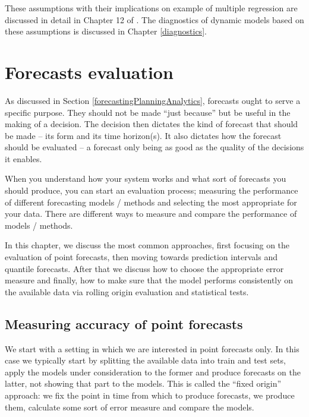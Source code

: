 \documentclass[
]{book}
\theoremstyle{definition}
\theoremstyle{definition}
\theoremstyle{definition}
\theoremstyle{definition}
\theoremstyle{remark}
\begin{document}
These assumptions with their implications on example of multiple regression are discussed in detail in Chapter 12 of \citet{SvetunkovSBA}. The diagnostics of dynamic models based on these assumptions is discussed in Chapter \ref{diagnostics}.

\hypertarget{forecastsEvaluation}{%
\chapter{Forecasts evaluation}\label{forecastsEvaluation}}

As discussed in Section \ref{forecastingPlanningAnalytics}, forecasts ought to serve a specific purpose. They should not be made ``just because'' but be useful in the making of a decision. The decision then dictates the kind of forecast that should be made -- its form and its time horizon(s). It also dictates how the forecast should be evaluated -- a forecast only being as good as the quality of the decisions it enables.

When you understand how your system works and what sort of forecasts you should produce, you can start an evaluation process; measuring the performance of different forecasting models / methods and selecting the most appropriate for your data. There are different ways to measure and compare the performance of models / methods.

In this chapter, we discuss the most common approaches, first focusing on the evaluation of point forecasts, then moving towards prediction intervals and quantile forecasts. After that we discuss how to choose the appropriate error measure and finally, how to make sure that the model performs consistently on the available data via rolling origin evaluation and statistical tests.

\hypertarget{errorMeasures}{%
\section{Measuring accuracy of point forecasts}\label{errorMeasures}}

We start with a setting in which we are interested in point forecasts only. In this case we typically start by splitting the available data into train and test sets, apply the models under consideration to the former and produce forecasts on the latter, not showing that part to the models. This is called the ``fixed origin'' approach: we fix the point in time from which to produce forecasts, we produce them, calculate some sort of error measure and compare the models.
\end{document}
